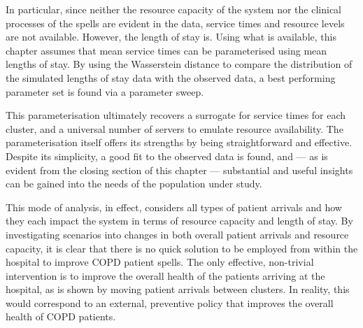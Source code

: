In particular, since neither the resource capacity of the system nor the
clinical processes of the spells are evident in the data, service times and
resource levels are not available. However, the length of stay is. Using what is
available, this chapter assumes that mean service times can be parameterised
using mean lengths of stay. By using the Wasserstein distance to compare the
distribution of the simulated lengths of stay data with the observed data, a
best performing parameter set is found via a parameter sweep.

This parameterisation ultimately recovers a surrogate for service times for each
cluster, and a universal number of servers to emulate resource availability. The
parameterisation itself offers its strengths by being straightforward and
effective. Despite its simplicity, a good fit to the observed data is found,
and --- as is evident from the closing section of this chapter --- substantial
and useful insights can be gained into the needs of the population under study.

This mode of analysis, in effect, considers all types of patient arrivals and
how they each impact the system in terms of resource capacity and length of
stay. By investigating scenarios into changes in both overall patient arrivals
and resource capacity, it is clear that there is no quick solution to be
employed from within the hospital to improve COPD patient spells. The only
effective, non-trivial intervention is to improve the overall health of the
patients arriving at the hospital, as is shown by moving patient arrivals
between clusters. In reality, this would correspond to an external, preventive
policy that improves the overall health of COPD patients.
